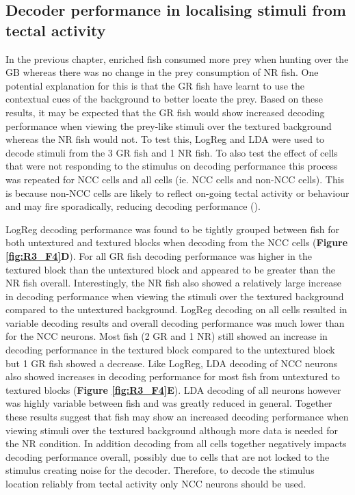 \subsection{Decoder performance in localising stimuli from tectal activity}
In the previous chapter, enriched fish consumed more prey when hunting over the GB whereas there was no change in the prey consumption of NR fish. One potential explanation for this is that the GR fish have learnt to use the contextual cues of the background to better locate the prey. Based on these results, it may be expected that the GR fish would show increased decoding performance when viewing the prey-like stimuli over the textured background whereas the NR fish would not. To test this, LogReg and LDA were used to decode stimuli from the 3 GR fish and 1 NR fish. To also test the effect of cells that were not responding to the stimulus on decoding performance this process was repeated for NCC cells and all cells (ie. NCC cells and non-NCC cells). This is because non-NCC cells are likely to reflect on-going tectal activity or behaviour and may fire sporadically, reducing decoding performance (\cite{Kahn2015ANeurons}). 

LogReg decoding performance was found to be tightly grouped between fish for both untextured and textured blocks when decoding from the NCC cells (\textbf{Figure \ref{fig:R3_F4}D}). For all GR fish decoding performance was higher in the textured block than the untextured block and appeared to be greater than the NR fish overall. Interestingly, the NR fish also showed a relatively large increase in decoding performance when viewing the stimuli over the textured background compared to the untextured background.  LogReg decoding on all cells resulted in variable decoding results and overall decoding performance was much lower than for the NCC neurons. Most fish (2 GR and 1 NR) still showed an increase in decoding performance in the textured block compared to the untextured block but 1 GR fish showed a decrease. Like LogReg, LDA decoding of NCC neurons also showed increases in decoding performance for most fish from untextured to textured blocks (\textbf{Figure \ref{fig:R3_F4}E}).  LDA decoding of all neurons however was highly variable between fish and was greatly reduced in general. Together these results suggest that fish may show an increased decoding performance when viewing stimuli over the textured background although more data is needed for the NR condition. In addition decoding from all cells together negatively impacts decoding performance overall, possibly due to cells that are not locked to the stimulus creating noise for the decoder. Therefore, to decode the stimulus location reliably from tectal activity only NCC neurons should be used.

